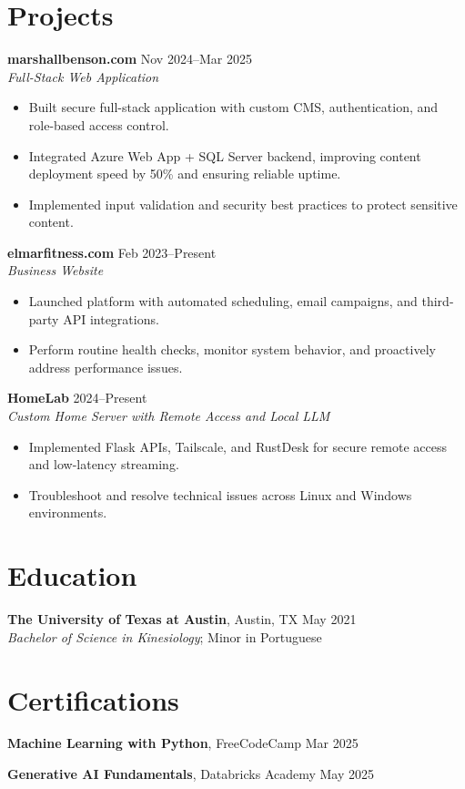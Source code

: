 \documentclass[letterpaper,10pt]{article}
\newcommand{\resumeItem}[1]{\item[] \small{#1}}
\begin{document}
\section*{Projects}
\begin{compactitem}
  \item[]
    \textbf{marshallbenson.com} \hfill Nov 2024--Mar 2025 \\
    \textit{Full-Stack Web Application}
  \begin{itemize}
    \resumeItem{Built secure full-stack application with custom CMS, authentication, and role-based access control.}
    \resumeItem{Integrated Azure Web App + SQL Server backend, improving content deployment speed by 50\% and ensuring reliable uptime.}
    \resumeItem{Implemented input validation and security best practices to protect sensitive content.}
  \end{itemize}

  \item[]
    \textbf{elmarfitness.com} \hfill Feb 2023--Present \\
    \textit{Business Website}
  \begin{itemize}
    \resumeItem{Launched platform with automated scheduling, email campaigns, and third-party API integrations.}
    \resumeItem{Perform routine health checks, monitor system behavior, and proactively address performance issues.}
  \end{itemize}

  \item[]
    \textbf{HomeLab} \hfill 2024--Present \\
    \textit{Custom Home Server with Remote Access and Local LLM}
  \begin{itemize}
    \resumeItem{Implemented Flask APIs, Tailscale, and RustDesk for secure remote access and low-latency streaming.}
    \resumeItem{Troubleshoot and resolve technical issues across Linux and Windows environments.}
  \end{itemize}
\end{compactitem}

\section*{Education}
\begin{compactitem}
  \item[]
    \textbf{The University of Texas at Austin}, Austin, TX \hfill May 2021 \\
    \textit{Bachelor of Science in Kinesiology}; Minor in Portuguese
\end{compactitem}

\section*{Certifications}
\begin{compactitem}
  \item[]
    \textbf{Machine Learning with Python}, FreeCodeCamp \hfill Mar 2025
  \item[]
    \textbf{Generative AI Fundamentals}, Databricks Academy \hfill May 2025
\end{compactitem}
\end{document}
